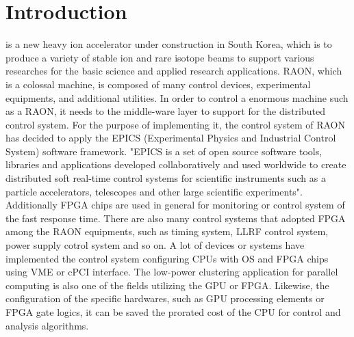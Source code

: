 \documentclass[journal]{IEEEtran}
\begin{document}


\section{Introduction}
% 
% 
% 
% 
 is a new heavy ion accelerator under construction in South Korea, which is to produce a variety of stable ion and rare isotope beams to support various researches for the basic science and applied research applications\cite{risp}. RAON, which is a colossal machine, is composed of many control devices, experimental equipments, and additional utilities. In order to control a enormous machine such as a RAON, it needs to the middle-ware layer to support for the distributed control system. For the purpose of  implementing it, the control system of RAON has decided to apply the EPICS (Experimental Physics and Industrial Control System) software framework. "EPICS is a set of open source software tools, libraries and applications developed collaboratively and used worldwide to create distributed soft real-time control systems for scientific instruments such as a particle accelerators, telescopes and other large scientific experiments"\cite{epics}. Additionally FPGA chips are used in general for monitoring or control system of the fast response time. There are also many control systems that adopted FPGA among the RAON equipments, such as timing system, LLRF control system, power supply cotrol system and so on. A lot of devices or systems have implemented the control system configuring CPUs with OS and FPGA chips using VME or cPCI interface. The low-power clustering application for parallel computing is also one of the fields utilizing the GPU or FPGA. Likewise, the configuration of the specific hardwares, such as GPU processing elements or FPGA gate logics, it can be saved the prorated cost of the CPU for control and analysis algorithms. 
\end{document}
